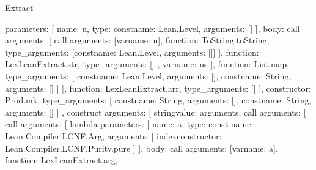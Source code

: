 \begin{lexlean}{Extract}
\begin{toolingmodule}
{{{{{{{{{{                                  parameters: [
                                    {name: u, type: const{name: Lean.Level, arguments: []}}
                                  ],
                                  body: call{
                                    arguments: [
                                      call{
                                        arguments: [var{name: u}],
                                        function: ToString.toString,
                                        type_arguments: [const{name: Lean.Level, arguments: []}]
                                      }
                                    ],
                                    function: LexLeanExtract.str,
                                    type_arguments: []
                                  }
                                },
                                var{name: us}
                              ],
                              function: List.map,
                              type_arguments: [
                                const{name: Lean.Level, arguments: []},
                                const{name: String, arguments: []}
                              ]
                            }
                          ],
                          function: LexLeanExtract.arr,
                          type_arguments: []
                        }
                      ],
                      constructor: Prod.mk,
                      type_arguments: [
                        const{name: String, arguments: []},
                        const{name: String, arguments: []}
                      ]
                    },
                    construct{
                      arguments: [
                        string{value: arguments},
                        call{
                          arguments: [
                            call{
                              arguments: [
                                lambda{
                                  parameters: [
                                    {
                                      name: a,
                                      type: const{
                                        name: Lean.Compiler.LCNF.Arg,
                                        arguments: [
                                          index{constructor: Lean.Compiler.LCNF.Purity.pure}
                                        ]
                                      }
                                    }
                                  ],
                                  body: call{
                                    arguments: [var{name: a}],
                                    function: LexLeanExtract.arg,
}}}}}}}}}}}
\end{toolingmodule}
\end{lexlean}
